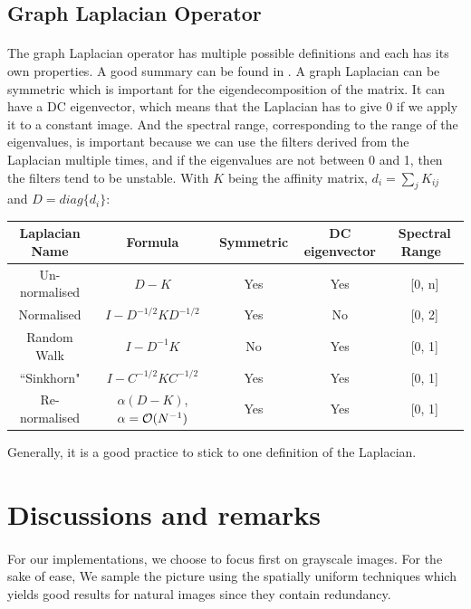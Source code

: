 \subsection{Graph Laplacian Operator}
\label{subsec:laplacian-variations}

\paragraph{}
The graph Laplacian operator has multiple possible definitions and each has its own properties.
A good summary can be found in \cite{siam_slides_2016}.
A graph Laplacian can be symmetric which is important for the eigendecomposition of the matrix.
It can have a DC eigenvector, which means that the Laplacian has to give 0 if we apply it to a constant image.
And the spectral range, corresponding to the range of the eigenvalues, is important because we can use the filters derived from the Laplacian multiple times, and if the eigenvalues are not between 0 and 1, then the filters tend to be unstable.
With \(K\) being the affinity matrix, \(d_i = \sum_j K_{ij}\) and \(D = diag\{d_i\}\):

\begin{table}[!htbp]
 \centering
 \begin{tabular}{|c|c|c|c|c|}
  \hline
  Laplacian Name & Formula & Symmetric & DC eigenvector & Spectral Range \\
  \hline
  Un-normalised & \(D - K\) & Yes & Yes & [0, n] \\
  \hline
  Normalised & \(I - D^{-1/2}KD^{-1/2}\) & Yes & No & [0, 2] \\
  \hline
  Random Walk & \(I - D^{-1}K\) & No & Yes & [0, 1] \\
  \hline
  ``Sinkhorn" \cite{milanfar_symmetrizing_2013} & \(I - C^{-1/2}KC^{-1/2}\) & Yes & Yes & [0, 1] \\
  \hline
  Re-normalised \cite{milanfar_new_2016} & \(\alpha(D - K)\), \(\alpha = \operatorname{\mathcal{O}}(N^{-1})\) & Yes & Yes & [0, 1] \\
  \hline
 \end{tabular}
\end{table}

Generally, it is a good practice to stick to one definition of the Laplacian.

\section{Discussions and remarks}

\paragraph{}
For our implementations, we choose to focus first on grayscale images.
For the sake of ease, We sample the picture using the spatially uniform techniques which yields good results for natural images since they contain redundancy.

